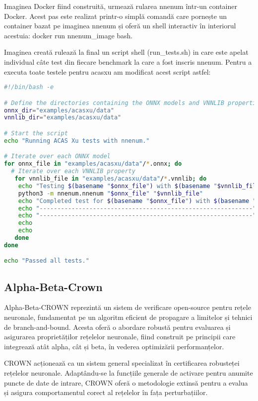 \documentclass[12pt,a4paper]{article}
\begin{document}
Imaginea Docker fiind construită, urmează rularea nnenum într-un container Docker. Acest pas este realizat printr-o simplă comandă care pornește un container bazat pe imaginea nnenum și oferă un shell interactiv în interiorul acestuia: docker run nnenum\_image bash.

Imaginea creată rulează la final un script shell (run\_tests.sh) in care este apelat individual câte test din fiecare benchmark la care a fost inscris nnenum. Pentru a executa toate testele pentru acasxu am modificat acest script astfel: 

\vspace{2mm}

\begin{lstlisting}[language=bash]
#!/bin/bash -e

# Define the directories containing the ONNX models and VNNLIB properties
onnx_dir="examples/acasxu/data"
vnnlib_dir="examples/acasxu/data"

# Start the script
echo "Running ACAS Xu tests with nnenum."

# Iterate over each ONNX model
for onnx_file in "examples/acasxu/data"/*.onnx; do
  # Iterate over each VNNLIB property
   for vnnlib_file in "examples/acasxu/data"/*.vnnlib; do
    echo "Testing $(basename "$onnx_file") with $(basename "$vnnlib_file")"
    python3 -m nnenum.nnenum "$onnx_file" "$vnnlib_file"
    echo "Completed test for $(basename "$onnx_file") with $(basename "$vnnlib_file")"
    echo "------------------------------------------------------------"
    echo "------------------------------------------------------------"
    echo
    echo
   done
done

echo "Passed all tests."

\end{lstlisting}

\vspace{5mm}
\subsection{Alpha-Beta-Crown}
Alpha-Beta-CROWN reprezintă un sistem de verificare open-source pentru rețele neuronale, fundamentat pe un algoritm eficient de propagare a limitelor și tehnici de branch-and-bound. Acesta oferă o abordare robustă pentru evaluarea și asigurarea proprietăților rețelelor neuronale, fiind construit pe principii care integrează atât alpha, cât și beta, în vederea optimizării performanțelor.

CROWN acționează ca un sistem general specializat în certificarea robusteței rețelelor neuronale. Adaptându-se la funcțiile generale de activare pentru anumite puncte de date de intrare, CROWN oferă o metodologie extinsă pentru a evalua și asigura comportamentul corect al rețelelor în fața perturbațiilor. 
\end{document}
